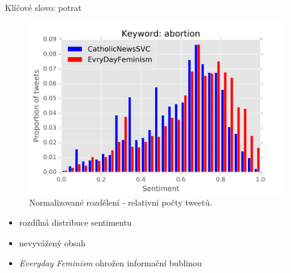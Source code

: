 \documentclass[notheorems,12pt]{beamer}
\begin{document}
\begin{frame}{Klíčové slovo: potrat}
    \begin{figure}
        \centering
        \includegraphics[scale=0.5]{./Pics/feminismXcatholic-normed.png}
        \caption*{Normalizované rozdělení - relativní počty tweetů.}
    \end{figure}
    \vspace{-0.6cm}
    \begin{itemize}
    	\item rozdílná distribuce sentimentu
        \item nevyvážený obsah
    	\item \textit{Everyday Feminism} ohrožen informační bublinou
    \end{itemize}
\end{frame}
\end{document}
